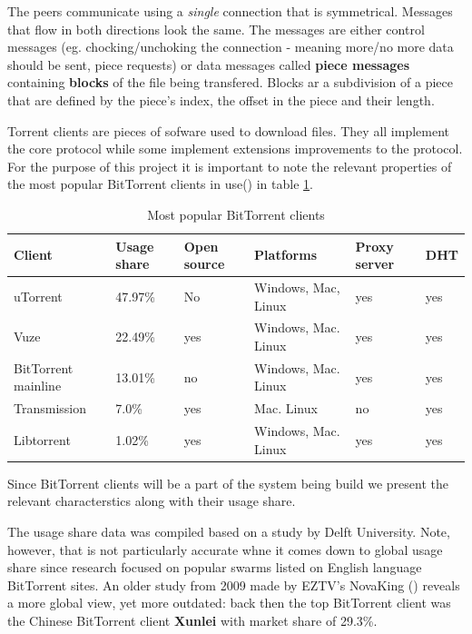 \documentclass[11pt]{book} %
\begin{document}
The peers communicate using a \textit{single} connection that is symmetrical. Messages that flow in both directions look the same. The messages are either control messages (eg. chocking/unchoking the connection - meaning more/no more data should be sent, piece requests) or data messages called \textbf{piece messages} containing \textbf{blocks} of the file being transfered. Blocks ar a subdivision of a piece that are defined by the piece's index, the offset in the piece and their length.


Torrent clients are pieces of sofware used to download files. They all implement the core protocol while some implement extensions improvements to the protocol.
For the purpose of this project it is important to note the relevant properties of the most popular BitTorrent clients in use(\citep*{btUsage}) in table \ref{btClients}.


\begin{table}
    \begin{tabular}{|l|l|l|l|l|l|}
    \hline
    Client              & Usage share & Open source & Platforms                                   & Proxy server & DHT \\ \hline
    uTorrent            & 47.97\%     & No          & Windows, Mac, Linux  & yes          & yes \\ \hline
    Vuze                & 22.49\%     & yes         & Windows, Mac. Linux                         & yes          & yes \\ \hline
    BitTorrent mainline & 13.01\%     & no          & Windows, Mac. Linux                         & yes          & yes \\ \hline
    Transmission        & 7.0\%       & yes         & Mac. Linux                                  & no           & yes \\ \hline
    Libtorrent          & 1.02\%      & yes         & Windows, Mac. Linux                         & yes          & yes \\ \hline
    \end{tabular}
    \caption {Most popular BitTorrent clients}
    \label {btClients}
\end{table}

Since BitTorrent clients will be a part of the system being build we present the relevant characterstics along with their usage share.

The usage share data was compiled based on a study by Delft University. Note, however, that is not particularly accurate whne it comes down to global usage share since research focused on popular swarms listed on English language BitTorrent sites. An older study from 2009 made by EZTV’s NovaKing (\citep*{web:oldbtUsage}) reveals a more global view, yet more outdated: back then the top BitTorrent client was the Chinese BitTorrent client \textbf{Xunlei} with market share of 29.3\%.
\end{document}
